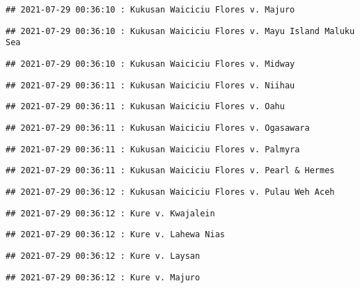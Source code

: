 \documentclass[
]{article}
\begin{document}
\begin{verbatim}
## 2021-07-29 00:36:10 : Kukusan Waiciciu Flores v. Majuro
\end{verbatim}

\begin{verbatim}
## 2021-07-29 00:36:10 : Kukusan Waiciciu Flores v. Mayu Island Maluku Sea
\end{verbatim}

\begin{verbatim}
## 2021-07-29 00:36:10 : Kukusan Waiciciu Flores v. Midway
\end{verbatim}

\begin{verbatim}
## 2021-07-29 00:36:11 : Kukusan Waiciciu Flores v. Niihau
\end{verbatim}

\begin{verbatim}
## 2021-07-29 00:36:11 : Kukusan Waiciciu Flores v. Oahu
\end{verbatim}

\begin{verbatim}
## 2021-07-29 00:36:11 : Kukusan Waiciciu Flores v. Ogasawara
\end{verbatim}

\begin{verbatim}
## 2021-07-29 00:36:11 : Kukusan Waiciciu Flores v. Palmyra
\end{verbatim}

\begin{verbatim}
## 2021-07-29 00:36:11 : Kukusan Waiciciu Flores v. Pearl & Hermes
\end{verbatim}

\begin{verbatim}
## 2021-07-29 00:36:12 : Kukusan Waiciciu Flores v. Pulau Weh Aceh
\end{verbatim}

\begin{verbatim}
## 2021-07-29 00:36:12 : Kure v. Kwajalein
\end{verbatim}

\begin{verbatim}
## 2021-07-29 00:36:12 : Kure v. Lahewa Nias
\end{verbatim}

\begin{verbatim}
## 2021-07-29 00:36:12 : Kure v. Laysan
\end{verbatim}

\begin{verbatim}
## 2021-07-29 00:36:12 : Kure v. Majuro
\end{verbatim}
\end{document}
